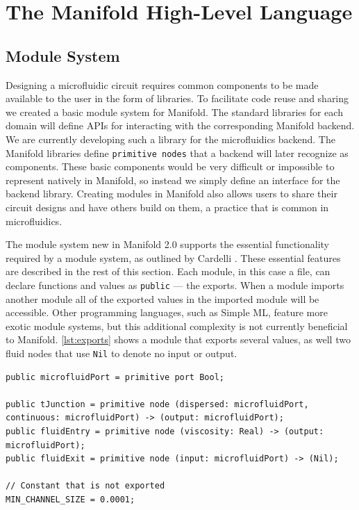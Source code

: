 \section{The Manifold High-Level Language}

\subsection{Module System}

Designing a microfluidic circuit requires common components to be made available to the user in the 
form of libraries. To facilitate code reuse and sharing we created a basic module system for Manifold.
The standard libraries for each domain will define APIs for interacting with the corresponding Manifold
backend. We are currently developing such a library for the microfluidics backend. The Manifold libraries
define \texttt{primitive nodes} that a backend will later recognize as components. These basic
components would be very difficult or impossible to represent natively in Manifold,
so instead we simply define an interface for the backend library. Creating
modules in Manifold also allows users to share their circuit designs and have
others build on them, a practice that is common in microfluidics.

The module system new in Manifold 2.0 supports the essential functionality required by a module system,
as outlined by Cardelli \cite{Cardelli:1997:PFL:263699.263735}. These
essential features are described in the rest of this section. Each module, in this case a file, can
declare functions and values as \texttt{public} --- the exports. When a module imports another
module all of the exported values in the imported module will be
accessible. Other programming languages, such as Simple ML, feature more exotic module systems, but this
additional complexity is not currently beneficial to Manifold. \autoref{lst:exports} shows a module
that exports several values, as well two
fluid nodes that use \texttt{Nil} to denote no input or output.

\begin{lstlisting}[label=lst:exports, caption=Exported values in a Manifold file]
public microfluidPort = primitive port Bool;

public tJunction = primitive node (dispersed: microfluidPort, continuous: microfluidPort) -> (output: microfluidPort);
public fluidEntry = primitive node (viscosity: Real) -> (output: microfluidPort);
public fluidExit = primitive node (input: microfluidPort) -> (Nil);

// Constant that is not exported
MIN_CHANNEL_SIZE = 0.0001;
\end{lstlisting}

